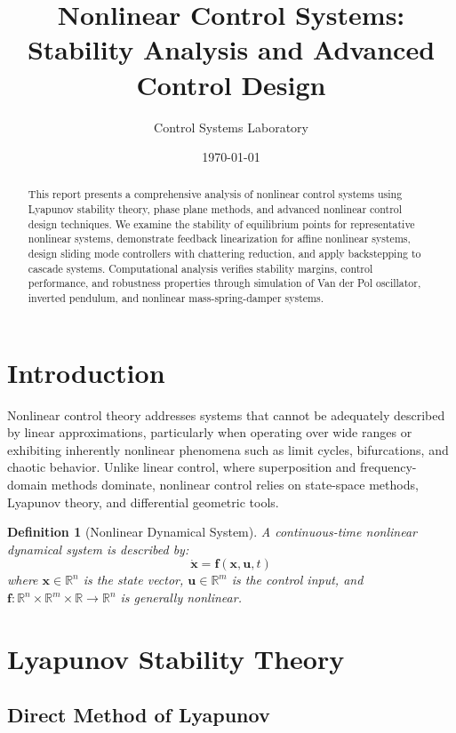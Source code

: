 \documentclass[a4paper, 11pt]{article}
\title{Nonlinear Control Systems: Stability Analysis and Advanced Control Design}
\author{Control Systems Laboratory}
\date{\today}
\newtheorem{definition}{Definition}[section]
\begin{document}
\maketitle

\begin{abstract}
This report presents a comprehensive analysis of nonlinear control systems using Lyapunov
stability theory, phase plane methods, and advanced nonlinear control design techniques.
We examine the stability of equilibrium points for representative nonlinear systems,
demonstrate feedback linearization for affine nonlinear systems, design sliding mode
controllers with chattering reduction, and apply backstepping to cascade systems.
Computational analysis verifies stability margins, control performance, and robustness
properties through simulation of Van der Pol oscillator, inverted pendulum, and nonlinear
mass-spring-damper systems.
\end{abstract}

\section{Introduction}

Nonlinear control theory addresses systems that cannot be adequately described by linear
approximations, particularly when operating over wide ranges or exhibiting inherently
nonlinear phenomena such as limit cycles, bifurcations, and chaotic behavior. Unlike
linear control, where superposition and frequency-domain methods dominate, nonlinear
control relies on state-space methods, Lyapunov theory, and differential geometric tools.

\begin{definition}[Nonlinear Dynamical System]
A continuous-time nonlinear dynamical system is described by:
\begin{equation}
\dot{\mathbf{x}} = \mathbf{f}(\mathbf{x}, \mathbf{u}, t)
\end{equation}
where $\mathbf{x} \in \mathbb{R}^n$ is the state vector, $\mathbf{u} \in \mathbb{R}^m$ is the control input,
and $\mathbf{f}: \mathbb{R}^n \times \mathbb{R}^m \times \mathbb{R} \rightarrow \mathbb{R}^n$ is generally nonlinear.
\end{definition}

\section{Lyapunov Stability Theory}

\subsection{Direct Method of Lyapunov}
\end{document}
